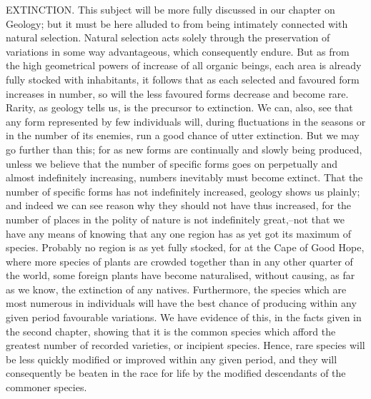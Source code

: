 EXTINCTION.
This subject will be more fully discussed in our chapter on Geology; but it must be here alluded to from being intimately connected with natural selection. Natural selection acts solely through the preservation of variations in some way advantageous, which consequently endure. But as from the high geometrical powers of increase of all organic beings, each area is already fully stocked with inhabitants, it follows that as each selected and favoured form increases in number, so will the less favoured forms decrease and become rare. Rarity, as geology tells us, is the precursor to extinction. We can, also, see that any form represented by few individuals will, during fluctuations in the seasons or in the number of its enemies, run a good chance of utter extinction. But we may go further than this; for as new forms are continually and slowly being produced, unless we believe that the number of specific forms goes on perpetually and almost indefinitely increasing, numbers inevitably must become extinct. That the number of specific forms has not indefinitely increased, geology shows us plainly; and indeed we can see reason why they should not have thus increased, for the number of places in the polity of nature is not indefinitely great,--not that we have any means of knowing that any one region has as yet got its maximum of species. Probably no region is as yet fully stocked, for at the Cape of Good Hope, where more species of plants are crowded together than in any other quarter of the world, some foreign plants have become naturalised, without causing, as far as we know, the extinction of any natives.
Furthermore, the species which are most numerous in individuals will have the best chance of producing within any given period favourable variations. We have evidence of this, in the facts given in the second chapter, showing that it is the common species which afford the greatest number of recorded varieties, or incipient species. Hence, rare species will be less quickly modified or improved within any given period, and they will consequently be beaten in the race for life by the modified descendants of the commoner species.
